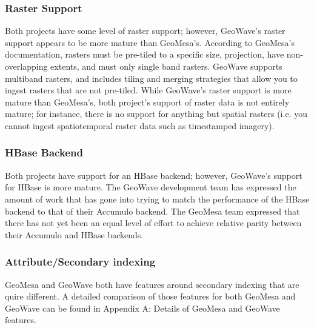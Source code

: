 \subsubsection{Raster Support}
\label{sec:featurecompare:other:raster}

Both projects have some level of raster support; however, GeoWave's raster support appears to be more mature than GeoMesa's.
According to GeoMesa's documentation, rasters must be pre-tiled to a specific size, projection, have non-overlapping extents, and must only single band rasters.
GeoWave supports multiband rasters, and includes tiling and merging strategies that allow you to ingest rasters that are not pre-tiled.
While GeoWave's raster support is more mature than GeoMesa's, both project's support of raster data is not entirely mature; for instance,
there is no support for anything but spatial rasters (i.e. you cannot ingest spatiotemporal raster data such as timestamped imagery).

  
\subsubsection{HBase Backend}
\label{sec:featurecompare:other:hbase}

Both projects have support for an HBase backend; however, GeoWave's support for HBase is more mature.
The GeoWave development team has expressed the amount of work that has gone into trying to match the performance of the HBase backend to that of their Accumulo backend.
The GeoMesa team expressed that there has not yet been an equal level of effort to achieve relative parity between their Accumulo and HBase backends.


\subsubsection{Attribute/Secondary indexing}
\label{sec:featurecompare:other:secondary}

GeoMesa and GeoWave both have features around secondary indexing that are quire different.
A detailed comparison of those features for both GeoMesa and GeoWave can be found in Appendix A: Details of GeoMesa and GeoWave features.
